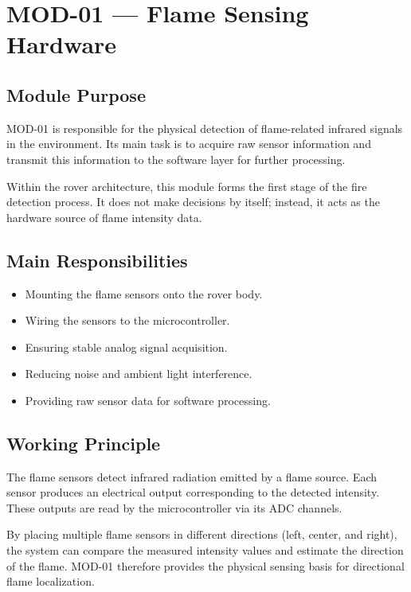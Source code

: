 \documentclass[12pt,a4paper]{article}
\begin{document}
\newpage

\section{MOD-01 --- Flame Sensing Hardware}

\subsection{Module Purpose}

MOD-01 is responsible for the physical detection of flame-related infrared signals
in the environment. Its main task is to acquire raw sensor information and transmit
this information to the software layer for further processing.

Within the rover architecture, this module forms the first stage of the fire
detection process. It does not make decisions by itself; instead, it acts as the
hardware source of flame intensity data.

\subsection{Main Responsibilities}

\begin{itemize}[leftmargin=1.5em]
  \item Mounting the flame sensors onto the rover body.
  \item Wiring the sensors to the microcontroller.
  \item Ensuring stable analog signal acquisition.
  \item Reducing noise and ambient light interference.
  \item Providing raw sensor data for software processing.
\end{itemize}

\subsection{Working Principle}

The flame sensors detect infrared radiation emitted by a flame source. Each sensor
produces an electrical output corresponding to the detected intensity. These outputs
are read by the microcontroller via its ADC channels.

By placing multiple flame sensors in different directions (left, center, and right),
the system can compare the measured intensity values and estimate the direction of
the flame. MOD-01 therefore provides the physical sensing basis for directional
flame localization.
\end{document}
